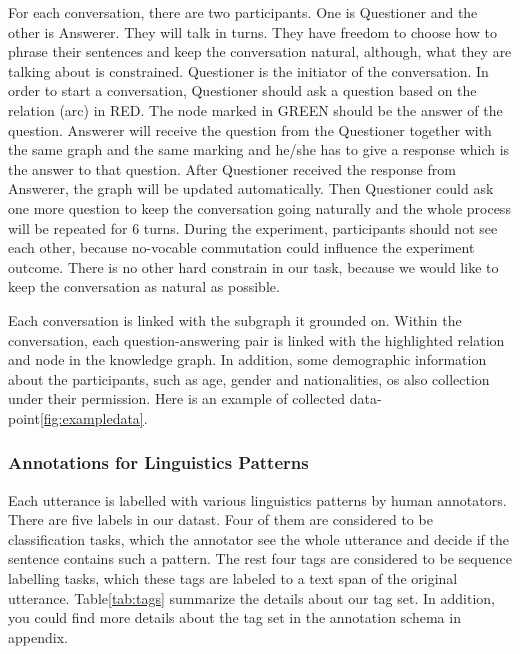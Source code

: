 \documentclass[bsc,frontabs,twoside,singlespacing,parskip,deptreport]{infthesis}     %
\begin{document}
For each conversation, there are two participants. One is Questioner and the other is Answerer. They will talk in turns. They have freedom to choose how to phrase their sentences and keep the conversation natural, although, what they are talking about is constrained. Questioner is the initiator of the conversation. In order to start a conversation, Questioner should ask a question based on the relation (arc) in RED. The node marked in GREEN should be the answer of the question. Answerer will receive the question from the Questioner together with the same graph and the same marking and he/she has to give a response which is the answer to that question. After Questioner received the response from Answerer, the graph will be updated automatically. Then Questioner could ask one more question to keep the conversation going naturally and the whole process will be repeated for 6 turns. During the experiment, participants should not see each other, because no-vocable commutation could influence the experiment outcome. There is no other hard constrain in our task, because we would like to keep the conversation as natural as possible.



Each conversation is linked with the subgraph it grounded on. Within the conversation, each question-answering pair is linked with the highlighted relation and node in the knowledge graph. In addition, some demographic information about the participants, such as age, gender and nationalities, os also collection under their permission. Here is an example of collected data-point\ref{fig:exampledata}.





\subsubsection*{Annotations for Linguistics Patterns}

Each utterance is labelled with various linguistics patterns by human annotators. There are five labels in our datast. Four of them are considered to be classification tasks, which the annotator see the whole utterance and decide if the sentence contains such a pattern. The rest four tags are considered to be sequence labelling tasks, which these tags are labeled to a text span of the original utterance. Table\ref{tab:tags} summarize the details about our tag set. In addition, you could find more details about the tag set in the annotation schema in appendix.
\end{document}
